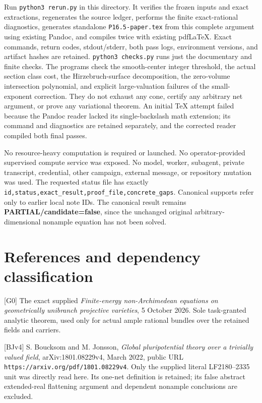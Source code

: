 \documentclass[
  10pt,
]{article}
\begin{document}
Run \texttt{python3\ rerun.py} in this directory. It verifies the frozen
inputs and exact extractions, regenerates the source ledger, performs
the finite exact-rational diagnostics, generates standalone
\texttt{P16.5-paper.tex} from this complete argument using existing
Pandoc, and compiles twice with existing pdfLaTeX. Exact commands,
return codes, stdout/stderr, both pass logs, environment versions, and
artifact hashes are retained. \texttt{python3\ checks.py} runs just the
documentary and finite checks. The programs check the smooth-center
integer threshold, the actual section class cost, the Hirzebruch-surface
decomposition, the zero-volume intersection polynomial, and explicit
large-valuation failures of the small-exponent correction. They do not
exhaust any cone, certify any arbitrary net argument, or prove any
variational theorem. An initial TeX attempt failed because the Pandoc
reader lacked its single-backslash math extension; its command and
diagnostics are retained separately, and the corrected reader compiled
both final passes.

No resource-heavy computation is required or launched. No
operator-provided supervised compute service was exposed. No model,
worker, subagent, private transcript, credential, other campaign,
external message, or repository mutation was used. The requested status
file has exactly
\texttt{id,status,exact\_result,proof\_file,concrete\_gaps}. Canonical
supports refer only to earlier local note IDs. The canonical result
remains \textbf{PARTIAL/candidate=false}, since the unchanged original
arbitrary-dimensional nonample equation has not been solved.

\section{References and dependency
classification}\label{references-and-dependency-classification}

{[}G0{]} The exact supplied \emph{Finite-energy non-Archimedean
equations on geometrically unibranch projective varieties}, 5 October
2026. Sole task-granted analytic theorem, used only for actual ample
rational bundles over the retained fields and carriers.

{[}BJv4{]} S. Boucksom and M. Jonsson, \emph{Global pluripotential
theory over a trivially valued field}, arXiv:1801.08229v4, March 2022,
public URL \texttt{https://arxiv.org/pdf/1801.08229v4}. Only the
supplied literal LF2180--2335 unit was directly read here. Its one-net
definition is retained; its false abstract extended-real flattening
argument and dependent nonample conclusions are excluded.
\end{document}
